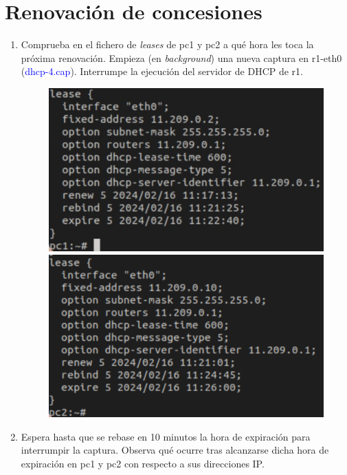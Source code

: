\documentclass[12pt, a4paper]{report}
\begin{document}
\chapter{Renovación de concesiones}
\begin{enumerate}
	\item Comprueba en el fichero de \textit{leases} de pc1 y pc2 a qué hora les toca la próxima renovación. Empieza
	(en \textit{background}) una nueva captura en r1-eth0 (\textcolor{blue}{dhcp-4.cap}). Interrumpe la ejecución del servidor de
	DHCP de r1.	\\
	\begin{figure}[!h]
		\centering
		\begin{minipage}[t]{.45\linewidth}
			\includegraphics[width=\linewidth]{ej1_1_4}
		\end{minipage}\hfill
		\begin{minipage}[b]{.45\linewidth}
			\includegraphics[width=\linewidth]{ej1_2_4}
		\end{minipage}
	\end{figure}
	\item Espera hasta que se rebase en 10 minutos la hora de expiración para interrumpir la captura. Observa
	qué ocurre tras alcanzarse dicha hora de expiración en pc1 y pc2 con respecto a sus direcciones IP.	\\
	

\end{enumerate}
\end{document}

